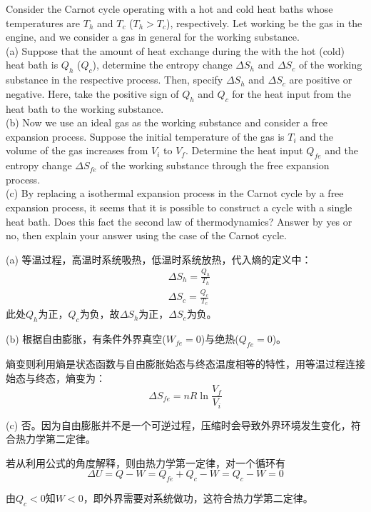     \begin{solution}[Entropy]
    	Consider the Carnot cycle operating with a hot and cold heat baths whose temperatures are $T_h$ and
    	$T_c$ ($T_h > T_c$), respectively. Let working  be the gas in the engine, and we consider a gas in
    	general for the working substance.\\
    	(a) Suppose that the amount of heat exchange during the  with the hot (cold) heat bath is
    	$Q_h$ ($Q_c$), determine the entropy change $\Delta S_h$ and $\Delta S_c$ of the working substance in the respective
    	process. Then, specify $\Delta S_h$ and $\Delta S_c$ are positive or negative. Here, take the positive sign of $Q_h$ and $Q_c$ for the heat input from the heat bath to the \linebreak working substance.\\
    	(b) Now we use an ideal gas as the working substance and consider a free expansion process. Suppose the
    	initial temperature of the gas is $T_i$ and the volume of the gas increases from $V_i$ to $V_f$. Determine the
    	heat input $Q_{fe}$ and the entropy change $\Delta S_{fe}$ of the working substance through the free expansion
    	process.\\
    	(c) By replacing a  isothermal expansion process in the Carnot cycle by a free expansion
    	process, it seems that it is possible to construct a cycle with a single heat bath. Does this fact
    	 the second law of thermodynamics? Answer by yes or no, then explain your answer using
    	the case of the Carnot cycle.
    	
    	\tcbrule
    	
        (a) 等温过程，高温时系统吸热，低温时系统放热，代入熵的定义中：
        \begin{equation*}
            \begin{aligned}
                &\Delta S_h = \frac{Q_h}{T_h}\\
                &\Delta S_c = \frac{Q_c}{T_c}
            \end{aligned}
        \end{equation*}
		此处$Q_h$为正，$Q_c$为负，故$\Delta S_h$为正，$\Delta S_c$为负。
		
        (b) 根据自由膨胀，有条件外界真空($W_{fe} = 0$)与绝热($Q_{fe} = 0$)。

        熵变则利用熵是状态函数与自由膨胀始态与终态温度相等的特性，用等温过程连接始态与终态，熵变为：
        \begin{equation*}
            \Delta S_{fe} = nR\ln{\frac{V_f}{V_i}}
        \end{equation*}

        (c) 否。因为自由膨胀并不是一个可逆过程，压缩时会导致外界环境发生变化，符合热力学第二定律。
        
        若从利用公式的角度解释，则由热力学第一定律，对一个循环有
        \[\Delta U=Q-W=Q_{fe}+Q_c-W=Q_c-W=0\]
        
        由$Q_c<0$知$W<0$，即外界需要对系统做功，这符合热力学第二定律。
    \end{solution}
